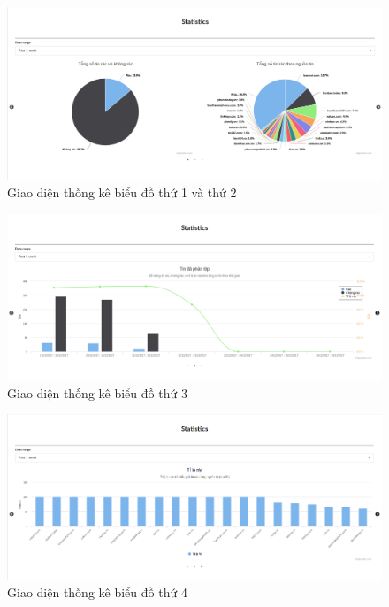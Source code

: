 \begin{figure}[H]
	\centering
	\includegraphics[width=0.96\linewidth]{Chapter3/Chapter3Figs/Chart1.png}
	\caption{Giao diện thống kê biểu đồ thứ 1 và thứ 2}
	\label{fig:streamingkeywords}
\end{figure}

\begin{figure}[H]
	\centering
	\includegraphics[width=0.96\linewidth]{Chapter3/Chapter3Figs/Chart2.png}
	\caption{Giao diện thống kê biểu đồ thứ 3}
	\label{fig:streamingkeywords}
\end{figure}

\begin{figure}[H]
	\centering
	\includegraphics[width=0.96\linewidth]{Chapter3/Chapter3Figs/Chart3.png}
  \caption{Giao diện thống kê biểu đồ thứ 4}
	\label{fig:streamingkeywords}
\end{figure}

